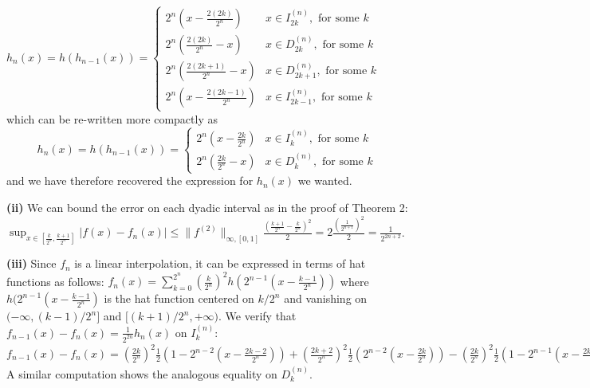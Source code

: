 \documentclass[a4paper,10pt]{article}
\begin{document}
\begin{scriptsize}
{$h_n(x) = h(h_{n-1}(x)) = \begin{cases} 2^n(x-\frac{2(2k)}{2^n}) & x \in I_{2k}^{(n)}, \text{ for some } k \\ 2^n(\frac{2(2k)}{2^n}-x) & x \in D_{2k}^{(n)}, \text{ for some } k \\ 2^n(\frac{2(2k+1)}{2^n}-x) & x \in D_{2k+1}^{(n)}, \text{ for some } k \\ 2^n(x-\frac{2(2k-1)}{2^n}) & x \in I_{2k-1}^{(n)}, \text{ for some } k \end{cases}$
which can be re-written more compactly as
$$h_n(x) = h(h_{n-1}(x)) = \begin{cases} 2^n(x-\frac{2k}{2^n}) & x \in I_k^{(n)}, \text{ for some } k \\ 2^n(\frac{2k}{2^n}-x) & x \in D_k^{(n)}, \text{ for some } k \end{cases}$$
and we have therefore recovered the expression for $h_n(x)$ we wanted.

\textbf{(ii)} We can bound the error on each dyadic interval as in the proof of Theorem 2:
$\sup_{x \in [\frac{k}{2^n},\frac{k+1}{2^n}]} |f(x)-f_n(x)| \leq \|f^{(2)}\|_{\infty,[0,1]} \frac{(\frac{k+1}{2^n}-\frac{k}{2^n})^2}{2} = 2\frac{(\frac{1}{2^{n+1}})^2}{2} = \frac{1}{2^{2n+2}}$.

\textbf{(iii)} Since $f_n$ is a linear interpolation, it can be expressed in terms of hat functions as follows:
$f_n(x) = \sum_{k=0}^{2^n} (\frac{k}{2^n})^2 h(2^{n-1}(x-\frac{k-1}{2^n}))$
where $h(2^{n-1}(x-\frac{k-1}{2^n})$ is the hat function centered on $k/2^n$ and vanishing on $(-\infty,(k-1)/2^n]$ and $[(k+1)/2^n,+\infty)$.
We verify that $f_{n-1}(x) - f_n(x) = \frac{1}{2^{2n}}h_n(x)$ on $I_k^{(n)}$:
$f_{n-1}(x) - f_n(x) = (\frac{2k}{2^n})^2\frac{1}{2}(1-2^{n-2}(x-\frac{2k-2}{2^n})) + (\frac{2k+2}{2^n})^2\frac{1}{2}(2^{n-2}(x-\frac{2k}{2^n})) - (\frac{2k}{2^n})^2\frac{1}{2}(1-2^{n-1}(x-\frac{2k-1}{2^n})) - (\frac{2k+1}{2^n})^2\frac{1}{2}(2^{n-1}(x-\frac{2k}{2^n})) = \frac{(2k)^2}{2^{2n}}(-2^{n-1}x + k-1) + \frac{(2k+2)^2}{2^{2n}}(2^{n-1}x-k) - \frac{(2k)^2}{2^{2n}}(-2^{n-1}x+2k-1) - \frac{(2k+1)^2}{2^{2n}}(2^nx-2k) = \frac{(2k)^2}{2^{2n}}(2^{n-1}x-k) + \frac{(2^{n-1}x-k)}{2^{2n}}((2k+2)^2-2(2k+1)^2) = \frac{1}{2^{2n}}(2^nx-2k) = h_n(x)$
A similar computation shows the analogous equality on $D_k^{(n)}$.

}
\end{scriptsize}
\end{document}
